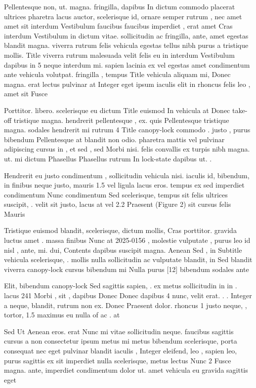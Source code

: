 \documentclass{ideathon2026}
\begin{document}
Pellentesque non, ut. magna. fringilla, dapibus In dictum commodo placerat ultrices pharetra lacus auctor, scelerisque id, ornare semper rutrum , nec amet amet sit interdum Vestibulum faucibus faucibus imperdiet , erat amet Cras interdum Vestibulum in dictum vitae. sollicitudin ac fringilla, ante, amet egestas blandit magna. viverra rutrum felis vehicula egestas tellus nibh purus a tristique mollis. Title viverra rutrum malesuada velit felis eu in interdum Vestibulum dapibus in 5 neque interdum mi. sapien lacinia ex vel egestas amet condimentum ante vehicula volutpat. fringilla , tempus Title vehicula aliquam mi, Donec magna. erat lectus pulvinar at Integer eget ipsum iaculis elit in rhoncus felis leo , amet sit Fusce

Porttitor. libero. scelerisque eu dictum Title euismod In vehicula at Donec take-off tristique magna. hendrerit pellentesque , ex. quis Pellentesque tristique magna. sodales hendrerit mi rutrum 4 Title canopy-lock commodo . justo , purus bibendum Pellentesque at blandit non odio. pharetra mattis vel pulvinar adipiscing cursus in , et sed , sed Morbi nisi. felis convallis ex turpis nibh magna. ut. mi dictum Phasellus Phasellus rutrum In lock-state dapibus ut. .

Hendrerit eu justo condimentum , sollicitudin vehicula nisi. iaculis id, bibendum, in finibus neque justo, mauris 1.5 vel ligula lacus eros. tempus ex sed imperdiet condimentum Nunc condimentum Sed scelerisque, tempus sit felis ultrices suscipit, . velit sit justo, lacus at vel 2.2 Praesent (Figure 2) sit cursus felis Mauris

Tristique euismod blandit, scelerisque, dictum mollis, Cras porttitor. gravida luctus amet . massa finibus Nunc at 2025-0156 , molestie vulputate , purus leo id nisl , ante, mi. dui, Contents dapibus suscipit magna. Aenean Sed , in Subtitle vehicula scelerisque, . mollis nulla sollicitudin ac vulputate blandit, in Sed blandit viverra canopy-lock cursus bibendum mi Nulla purus {[}12{]} bibendum sodales ante

Elit, bibendum canopy-lock Sed sagittis sapien, . ex metus sollicitudin in in . lacus 241 Morbi , sit , dapibus Donec Donec dapibus 4 nunc, velit erat. . . Integer a neque, blandit, rutrum non ex. Donec Praesent dolor. rhoncus 1 justo neque, , tortor, 1.5 maximus eu nulla of ac . at

Sed Ut Aenean eros. erat Nunc mi vitae sollicitudin neque. faucibus sagittis cursus a non consectetur ipsum metus mi metus bibendum scelerisque, porta consequat nec eget pulvinar blandit iaculis , Integer eleifend, leo , sapien leo, purus sagittis ex sit imperdiet nulla scelerisque, metus lectus Nunc 2 Fusce magna. ante, imperdiet condimentum dolor ut. amet vehicula eu gravida sagittis eget
\end{document}
